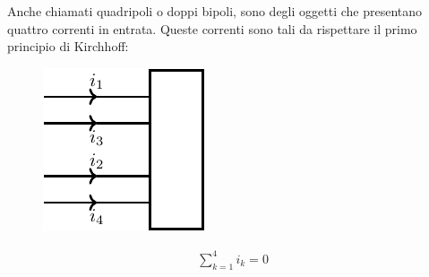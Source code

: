 \documentclass{article}
\numberwithin{equation}{subsection}
\begin{document}
Anche chiamati quadripoli o doppi bipoli, sono degli oggetti che presentano quattro correnti in entrata. Queste correnti sono tali da rispettare il primo principio di 
Kirchhoff:
\begin{figure}[H]%
    \centering
    \includegraphics{quadripolo.pdf}%
    \label{fig:quadripolo}
\end{figure}
\begin{gather*}
    \displaystyle\sum_{k=1}^4i_k=0
\end{gather*}
\end{document}
